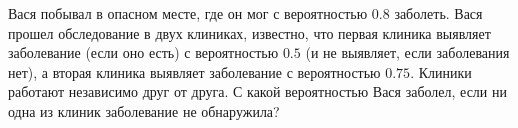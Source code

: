 Вася побывал в опасном месте, где он мог с вероятностью $0.8$ заболеть. Вася прошел обследование в двух клиниках, известно,
что первая клиника выявляет заболевание (если оно есть) с вероятностью $0.5$ (и не выявляет, если заболевания нет), а вторая
клиника выявляет заболевание с вероятностью $0.75$. Клиники работают независимо друг от друга. С какой вероятностью Вася
заболел, если ни одна из клиник заболевание не обнаружила?